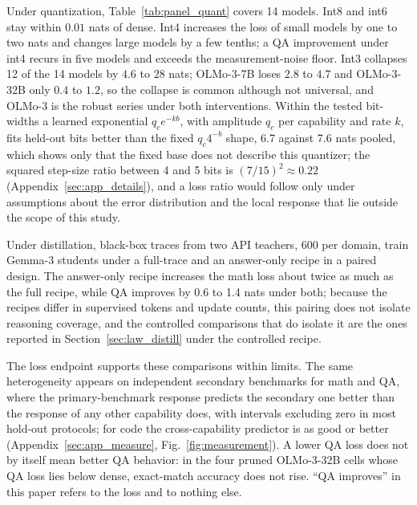 Under quantization, Table~\ref{tab:panel_quant} covers
14 models. Int8 and int6 stay within $0.01$ nats of dense. Int4 increases the loss of small models by one to two nats and changes large models by a few tenths; a QA
improvement under int4 recurs in five models and exceeds the measurement-noise floor. Int3 collapses 12 of the 14 models by $4.6$ to $28$ nats;
OLMo-3-7B loses $2.8$ to $4.7$ and OLMo-3-32B only $0.4$ to $1.2$, so
the collapse is common although not universal, and OLMo-3 is the robust
series under both interventions. Within the tested bit-widths a learned
exponential $q_c e^{-kb}$, with amplitude $q_c$ per capability and rate $k$, fits held-out bits better than the fixed $q_c4^{-b}$ shape, 6.7 against 7.6 nats pooled, which shows only
that the fixed base does not describe this quantizer; the squared
step-size ratio between 4 and 5 bits is $(7/15)^2\approx0.22$
(Appendix~\ref{sec:app_details}), and a loss ratio would follow only under assumptions about the error distribution and the local response that lie outside the scope of this
study.


Under distillation, black-box traces from two API teachers, 600 per domain, train Gemma-3 students under a full-trace and an
answer-only recipe in a paired design. The answer-only recipe increases the math loss about twice as much as the full recipe, while QA improves by 0.6 to 1.4 nats under both; because the recipes differ in supervised tokens and update
counts, this pairing does not isolate reasoning coverage, and the
controlled comparisons that do isolate it are the ones reported in Section~\ref{sec:law_distill} under the controlled recipe.

The loss endpoint supports these comparisons within limits. The same
heterogeneity appears on independent secondary benchmarks for math and
QA, where the primary-benchmark response predicts the secondary one
better than the response of any other capability does, with intervals
excluding zero in most hold-out protocols; for code the
cross-capability predictor is as good or better
(Appendix~\ref{sec:app_measure}, Fig.~\ref{fig:measurement}). A lower
QA loss does not by itself mean better QA behavior: in the four pruned
OLMo-3-32B cells whose QA loss lies below dense, exact-match accuracy
does not rise. ``QA improves'' in this paper refers to the loss and to nothing else.

